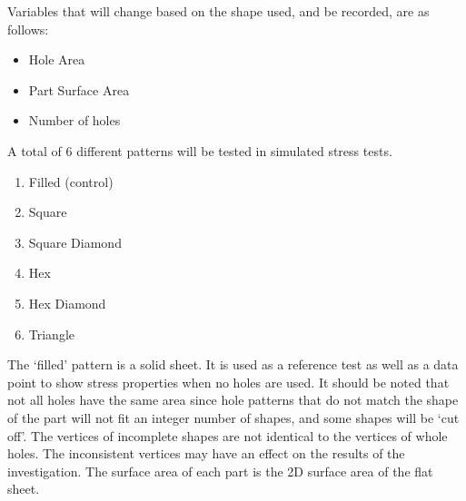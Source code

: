 \documentclass[12pt, letterpaper]{article}
\newcommand{\sorta}[1]{`#1'}
\begin{document}
Variables that will change based on the shape used, and be recorded, are as follows:

\begin{itemize}
\item Hole Area
\item Part Surface Area
\item Number of holes
\end{itemize}

A total of 6 different patterns will be tested in simulated stress tests.

\begin{enumerate}
\item Filled (control)
\item Square
\item Square Diamond
\item Hex
\item Hex Diamond
\item Triangle
\end{enumerate}

The \sorta{filled} pattern is a solid sheet. It is used as a reference test as well as a data point to show stress properties when no holes are used. It should be noted that not all holes have the same area since hole patterns that do not match the shape of the part will not fit an integer number of shapes, and some shapes will be \sorta{cut off}. The vertices of incomplete shapes are not identical to the vertices of whole holes. The inconsistent vertices may have an effect on the results of the investigation. The surface area of each part is the 2D surface area of the flat sheet. 
\end{document}

